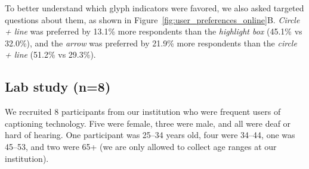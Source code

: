 To better understand which glyph indicators were favored, we also asked targeted questions about them, as shown in Figure~\ref{fig:user_preferences_online}B. \emph{Circle + line} was preferred by 13.1\% more respondents than the \emph{highlight box} (45.1\% vs 32.0\%), and the \emph{arrow} was preferred by 21.9\% more respondents than the \emph{circle + line} (51.2\% vs 29.3\%).


\subsection{Lab study (n=8)}
We recruited 8 participants from our institution who were frequent users of captioning technology. Five were female, three were male, and all were deaf or hard of hearing. One participant was 25--34 years old, four were 34--44, one was 45--53, and two were 65+ (we are only allowed to collect age ranges at our institution). 



